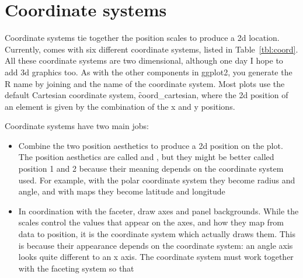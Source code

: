 \section{Coordinate systems}
\label{sec:coord}

Coordinate systems tie together the position scales to produce a 2d location. Currently, \ggplot comes with six different coordinate systems, listed in Table~\ref{tbl:coord}.  All these coordinate systems are two dimensional, although one day I hope to add 3d graphics too. As with the other components in ggplot2, you generate the R name by joining  and the name of the coordinate system.  Most plots use the default Cartesian coordinate system, \f{coord_cartesian}, where the 2d position of an element is given by the combination of the x and y positions.  

Coordinate systems have two main jobs: 

\begin{itemize}
  \item Combine the two position aesthetics to produce a 2d position on the plot.  The position aesthetics are called  and , but they might be better called position 1 and 2 because their meaning depends on the coordinate system used.  For example, with the polar coordinate system they become radius and angle, and with maps they become latitude and longitude
  
  \item In coordination with the faceter, draw axes and panel backgrounds.  While the scales control the values that appear on the axes, and how they map from data to position, it is the coordinate system which actually draws them.  This is because their appearance depends on the coordinate system: an angle axis looks quite different to an x axis.  The coordinate system must work together with the faceting system so that 

\end{itemize}


